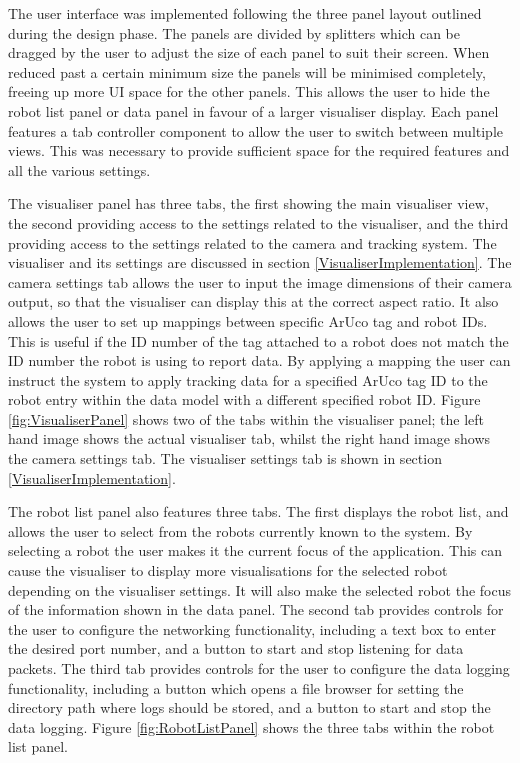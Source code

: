 The user interface was implemented following the three panel layout outlined during the design phase. The panels are divided by splitters which can be dragged by the user to adjust the size of each panel to suit their screen. When reduced past a certain minimum size the panels will be minimised completely, freeing up more UI space for the other panels. This allows the user to hide the robot list panel or data panel in favour of a larger visualiser display. Each panel features a tab controller component to allow the user to switch between multiple views. This was necessary to provide sufficient space for the required features and all the various settings. 

The visualiser panel has three tabs, the first showing the main visualiser view, the second providing access to the settings related to the visualiser, and the third providing access to the settings related to the camera and tracking system. The visualiser and its settings are discussed in section \ref{VisualiserImplementation}. The camera settings tab allows the user to input the image dimensions of their camera output, so that the visualiser can display this at the correct aspect ratio. It also allows the user to set up mappings between specific ArUco tag and robot IDs. This is useful if the ID number of the tag attached to a robot does not match the ID number the robot is using to report data. By applying a mapping the user can instruct the system to apply tracking data for a specified ArUco tag ID to the robot entry within the data model with a different specified robot ID. Figure \ref{fig:VisualiserPanel} shows two of the tabs within the visualiser panel; the left hand image shows the actual visualiser tab, whilst the right hand image shows the camera settings tab. The visualiser settings tab is shown in section \ref{VisualiserImplementation}.

The robot list panel also features three tabs. The first displays the robot list, and allows the user to select from the robots currently known to the system. By selecting a robot the user makes it the current focus of the application. This can cause the visualiser to display more visualisations for the selected robot depending on the visualiser settings. It will also make the selected robot the focus of the information shown in the data panel. The second tab provides controls for the user to configure the networking functionality, including a text box to enter the desired port number, and a button to start and stop listening for data packets. The third tab provides controls for the user to configure the data logging functionality, including a button which opens a file browser for setting the directory path where logs should be stored, and a button to start and stop the data logging. Figure \ref{fig:RobotListPanel} shows the three tabs within the robot list panel.

